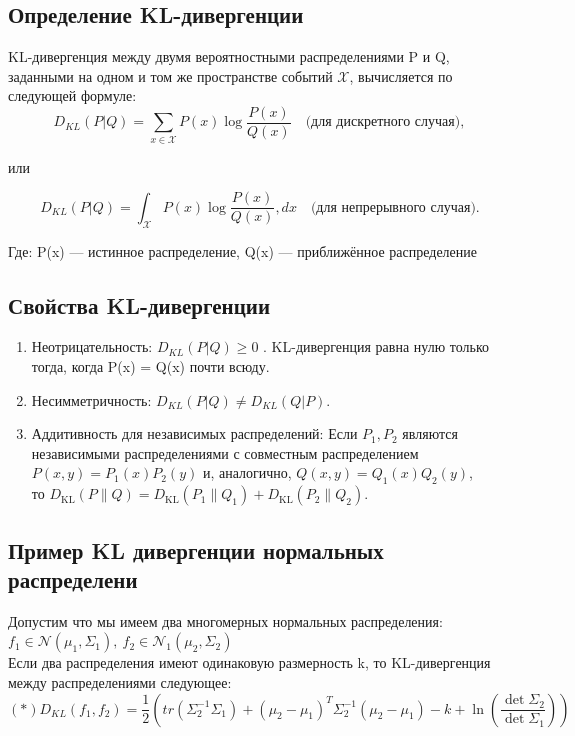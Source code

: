 \subsection*{Определение KL-дивергенции}

KL-дивергенция между двумя вероятностными распределениями  P и Q, заданными на одном и том же пространстве событий $\mathcal{X}$, вычисляется по следующей формуле:
\[
D_{KL}(P | Q) = \sum_{x \in \mathcal{X}} P(x) \log \frac{P(x)}{Q(x)} \quad \text{(для дискретного случая)},
\]

или

\[
D_{KL}(P | Q) = \int_{\mathcal{X}} P(x) \log \frac{P(x)}{Q(x)} , dx \quad \text{(для непрерывного случая)}.
\]

Где:
    P(x) — истинное распределение,
    Q(x) — приближённое распределение

\subsection*{Свойства KL-дивергенции}
\begin{enumerate}
    \item Неотрицательность: $ D_{KL}(P | Q) \geq 0 $ . KL-дивергенция равна нулю только тогда, когда P(x) = Q(x)  почти всюду.
    \item Несимметричность: $ D_{KL}(P | Q) \neq D_{KL}(Q | P) $.
    \item Аддитивность для независимых распределений:
     Если $\displaystyle P_{1},P_{2}$ являются независимыми распределениями с совместным распределением $\displaystyle P(x,y)=P_{1}(x)P_{2}(y)$ и, аналогично, $\displaystyle Q(x,y)=Q_{1}(x)Q_{2}(y)$,\\ то $\displaystyle D_{\mathrm {KL} }(P\parallel Q)=D_{\mathrm {KL} }(P_{1}\parallel Q_{1})+D_{\mathrm {KL} }(P_{2}\parallel Q_{2}).$
\end{enumerate}


\subsection*{Пример KL дивергенции нормальных распределени}
Допустим что мы имеем два многомерных нормальных распределения: $f_1 \in \mathcal{N}(\mu_1, \Sigma_1), \ f_2 \in \mathcal{N}_1(\mu_2, \Sigma_2)$
\\ 
Если два распределения имеют одинаковую размерность k, то KL-дивергенция между распределениями следующее:
\[ (*)
D_{KL}(f_1, f_2) = \frac{1}{2} (tr (\Sigma_2^{-1} \Sigma_1) + (\mu_2 - \mu_1)^T\Sigma_2^{-1}(\mu_2 - \mu_1) - k + \ln\left( \frac{\det \Sigma_2}{\det \Sigma_1} \right) )
\]

